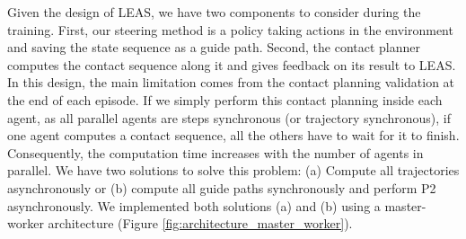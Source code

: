 Given the design of LEAS, we have two components to consider during the training. First, our steering method is a policy taking actions in the environment and saving the state sequence as a guide path. Second, the contact planner computes the contact sequence along it and gives feedback on its result to LEAS.
In this design, the main limitation comes from the contact planning validation at the end of each episode. 
If we simply perform this contact planning inside each agent, as all parallel agents are steps synchronous (or trajectory synchronous), if one agent computes a contact sequence, all the others have to wait for it to finish. Consequently, the computation time increases with the number of agents in parallel.
We have two solutions to solve this problem: (a) Compute all trajectories asynchronously or (b) compute all guide paths synchronously and perform P2 asynchronously.
We implemented both solutions (a) and (b) using a master-worker architecture (Figure \ref{fig:architecture_master_worker}).
